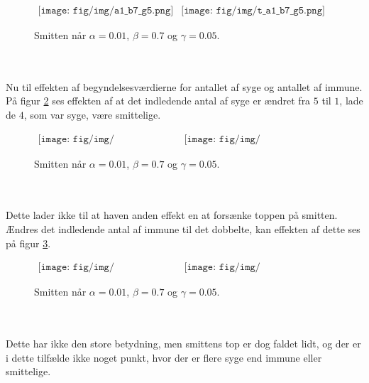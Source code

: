 %
\begin{figure}[!ht]
\centering
$
\begin{matrix}
\texttt{[image: fig/img/a1\_b7\_g5.png]}&
\texttt{[image: fig/img/t\_a1\_b7\_g5.png]}
\end{matrix}
$
\caption{Smitten når $\alpha = 0.01$, $\beta = 0.7$ og $\gamma = 0.05$.}
\label{fig:a1_b7_g5}
\end{figure}\\\\
%
Nu til effekten af begyndelsesværdierne for antallet af syge og antallet af immune.
På figur \ref{fig:x1_1_x2_95} ses effekten af at det indledende antal af syge er ændret fra $5$ til $1$, lade de $4$, som var syge, være smittelige.
%
\begin{figure}[!ht]
\centering
$
\begin{matrix}
\texttt{[image: fig/img/x1\_1\_x2\_95.png]}&
\texttt{[image: fig/img/t\_x1\_1\_x2\_95.png]}
\end{matrix}
$
\caption{Smitten når $\alpha = 0.01$, $\beta = 0.7$ og $\gamma = 0.05$.}
\label{fig:x1_1_x2_95}
\end{figure}\\\\
%
Dette lader ikke til at haven anden effekt en at forsænke toppen på smitten.
Ændres det indledende antal af immune til det dobbelte, kan effekten af dette ses på figur \ref{fig:x1_5_x2_85}.
%
\begin{figure}[!ht]
\centering
$
\begin{matrix}
\texttt{[image: fig/img/x1\_5\_x2\_85.png]}&
\texttt{[image: fig/img/t\_x1\_5\_x2\_85.png]}
\end{matrix}
$
\caption{Smitten når $\alpha = 0.01$, $\beta = 0.7$ og $\gamma = 0.05$.}
\label{fig:x1_5_x2_85}
\end{figure}\\\\
%
Dette har ikke den store betydning, men smittens top er dog faldet lidt, og der er i dette tilfælde ikke noget punkt, hvor der er flere syge end immune eller smittelige.